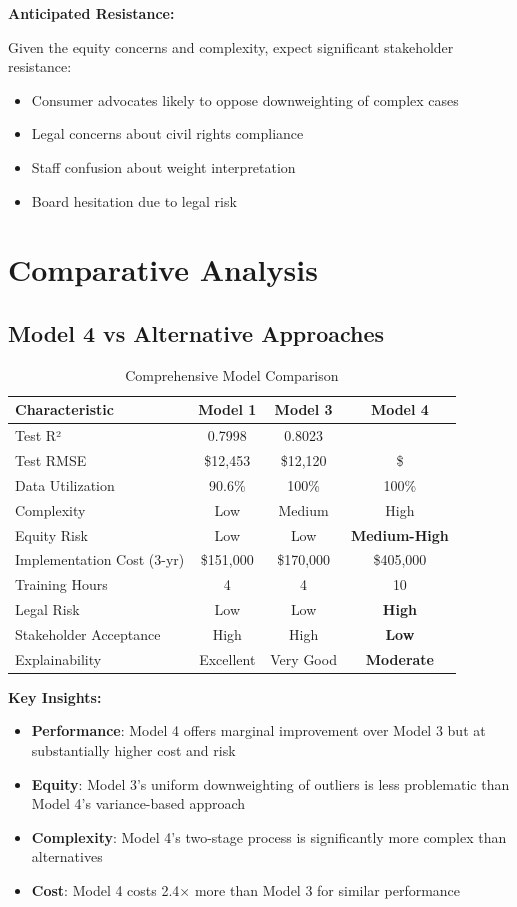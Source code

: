 \textbf{Anticipated Resistance:}

Given the equity concerns and complexity, expect significant stakeholder resistance:
\begin{itemize}
    \item Consumer advocates likely to oppose downweighting of complex cases
    \item Legal concerns about civil rights compliance
    \item Staff confusion about weight interpretation
    \item Board hesitation due to legal risk
\end{itemize}

\section{Comparative Analysis}

\subsection{Model 4 vs Alternative Approaches}

\begin{table}[h]
\centering
\caption{Comprehensive Model Comparison}
\begin{tabular}{lccc}
\toprule
\textbf{Characteristic} & \textbf{Model 1} & \textbf{Model 3} & \textbf{Model 4} \\
\midrule
Test R² & 0.7998 & 0.8023 & \ModelFourRSquaredTest{} \\
Test RMSE & \$12,453 & \$12,120 & \$\ModelFourRMSETest{} \\
Data Utilization & 90.6\% & 100\% & 100\% \\
Complexity & Low & Medium & High \\
Equity Risk & Low & Low & \textbf{Medium-High} \\
Implementation Cost (3-yr) & \$151,000 & \$170,000 & \$405,000 \\
Training Hours & 4 & 4 & 10 \\
Legal Risk & Low & Low & \textbf{High} \\
Stakeholder Acceptance & High & High & \textbf{Low} \\
Explainability & Excellent & Very Good & \textbf{Moderate} \\
\bottomrule
\end{tabular}
\end{table}

\textbf{Key Insights:}
\begin{itemize}
    \item \textbf{Performance}: Model 4 offers marginal improvement over Model 3 but at substantially higher cost and risk
    \item \textbf{Equity}: Model 3's uniform downweighting of outliers is less problematic than Model 4's variance-based approach
    \item \textbf{Complexity}: Model 4's two-stage process is significantly more complex than alternatives
    \item \textbf{Cost}: Model 4 costs 2.4$\times$ more than Model 3 for similar performance
\end{itemize}

